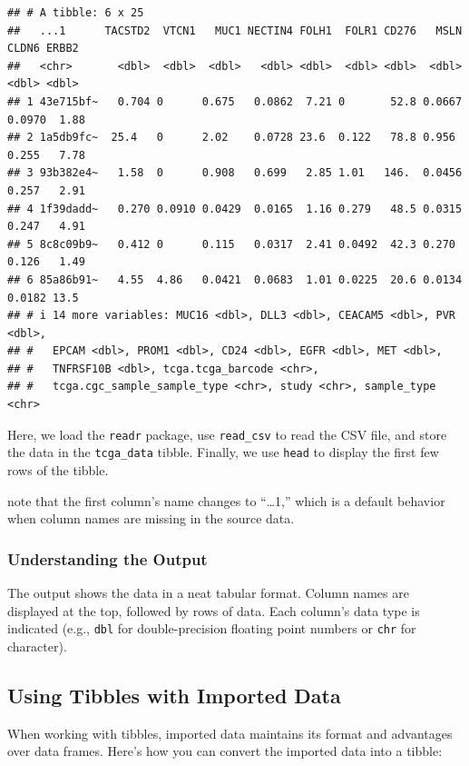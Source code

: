 \documentclass[
]{book}
\begin{document}
\begin{verbatim}
## # A tibble: 6 x 25
##   ...1      TACSTD2  VTCN1   MUC1 NECTIN4 FOLH1  FOLR1 CD276   MSLN  CLDN6 ERBB2
##   <chr>       <dbl>  <dbl>  <dbl>   <dbl> <dbl>  <dbl> <dbl>  <dbl>  <dbl> <dbl>
## 1 43e715bf~   0.704 0      0.675   0.0862  7.21 0       52.8 0.0667 0.0970  1.88
## 2 1a5db9fc~  25.4   0      2.02    0.0728 23.6  0.122   78.8 0.956  0.255   7.78
## 3 93b382e4~   1.58  0      0.908   0.699   2.85 1.01   146.  0.0456 0.257   2.91
## 4 1f39dadd~   0.270 0.0910 0.0429  0.0165  1.16 0.279   48.5 0.0315 0.247   4.91
## 5 8c8c09b9~   0.412 0      0.115   0.0317  2.41 0.0492  42.3 0.270  0.126   1.49
## 6 85a86b91~   4.55  4.86   0.0421  0.0683  1.01 0.0225  20.6 0.0134 0.0182 13.5 
## # i 14 more variables: MUC16 <dbl>, DLL3 <dbl>, CEACAM5 <dbl>, PVR <dbl>,
## #   EPCAM <dbl>, PROM1 <dbl>, CD24 <dbl>, EGFR <dbl>, MET <dbl>,
## #   TNFRSF10B <dbl>, tcga.tcga_barcode <chr>,
## #   tcga.cgc_sample_sample_type <chr>, study <chr>, sample_type <chr>
\end{verbatim}

Here, we load the \texttt{readr} package, use \texttt{read\_csv} to read the CSV file, and store the data in the \texttt{tcga\_data} tibble. Finally, we use \texttt{head} to display the first few rows of the tibble.

note that the first column's name changes to ``\ldots1,'' which is a default behavior when column names are missing in the source data.

\hypertarget{understanding-the-output}{%
\subsubsection{Understanding the Output}\label{understanding-the-output}}

The output shows the data in a neat tabular format. Column names are displayed at the top, followed by rows of data. Each column's data type is indicated (e.g., \texttt{dbl} for double-precision floating point numbers or \texttt{chr} for character).

\hypertarget{using-tibbles-with-imported-data}{%
\subsection{Using Tibbles with Imported Data}\label{using-tibbles-with-imported-data}}

When working with tibbles, imported data maintains its format and advantages over data frames. Here's how you can convert the imported data into a tibble:
\end{document}
